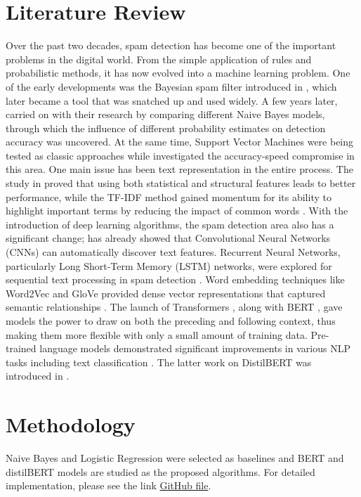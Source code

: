\documentclass{article}
\begin{document}
\section{Literature Review}
Over the past two decades, spam detection has become one of the important problems in the digital world. From the simple application of rules and probabilistic methods, it has now evolved into a machine learning problem. One of the early developments was the Bayesian spam filter introduced in \cite{sahami1998bayesian}, which later became a tool that was snatched up and used widely. A few years later, \cite{metsis2006spam} carried on with their research by comparing different Naive Bayes models, through which the influence of different probability estimates on detection accuracy was uncovered. At the same time, Support Vector Machines were being tested as classic approaches \cite{drucker1999support} while \cite{androutsopoulos2000evaluation} investigated the accuracy-speed compromise in this area. One main issue has been text representation in the entire process. The study in \cite{zhang2004evaluation} proved that using both statistical and structural features leads to better performance, while the TF-IDF method gained momentum for its ability to highlight important terms by reducing the impact of common words \cite{rennie2000application}. With the introduction of deep learning algorithms, the spam detection area also has a significant change; \cite{kim2014convolutional} has already showed that Convolutional Neural Networks (CNNs) can automatically discover text features. Recurrent Neural Networks, particularly Long Short-Term Memory (LSTM) networks, were explored for sequential text processing in spam detection \cite{hochreiter1997long}. Word embedding techniques like Word2Vec and GloVe provided dense vector representations that captured semantic relationships \cite{mikolov2013efficient}. The launch of Transformers \cite{vaswani2017attention}, along with BERT \cite{devlin2019bert}, gave models the power to draw on both the preceding and following context, thus making them more flexible with only a small amount of training data. Pre-trained language models demonstrated significant improvements in various NLP tasks including text classification \cite{howard2018universal}. The latter work on DistilBERT was introduced in \cite{sanh2019distilbert}.

\section{Methodology}
Naive Bayes and Logistic Regression were selected as baselines and BERT and distilBERT models are studied as the proposed algorithms. For detailed implementation, please see the link
\href{https://github.com/AydaNodel/COMP6321-Term-project--Spam-email-detection/tree/main}{GitHub file}.
\end{document}
